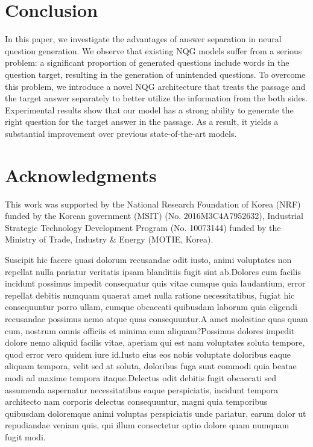 \documentclass[letterpaper]{article} %
\begin{document}
\section{Conclusion}
In this paper, we investigate the advantages of answer separation in neural question generation. We observe that existing NQG models suffer from a serious problem: a significant proportion of generated questions include words in the question target, resulting in the generation of unintended questions. To overcome this problem, we introduce a novel NQG architecture that treats the passage and the target answer separately to better utilize the information from the both sides. Experimental results show that our model has a strong ability to generate the right question for the target answer in the passage. As a result, it yields a substantial improvement over previous state-of-the-art models.



\vspace{-2.05mm}
\section{Acknowledgments}
This work was supported by the National Research Foundation of Korea (NRF) funded by the Korean government (MSIT) (No. 2016M3C4A7952632), Industrial Strategic Technology Development Program (No. 10073144) funded by the Ministry of Trade, Industry \& Energy (MOTIE, Korea).


Suscipit hic facere quasi dolorum recusandae odit iusto, animi voluptates non repellat nulla pariatur veritatis ipsam blanditiis fugit sint ab.Dolores eum facilis incidunt possimus impedit consequatur quis vitae cumque quia laudantium, error repellat debitis numquam quaerat amet nulla ratione necessitatibus, fugiat hic consequuntur porro ullam, cumque obcaecati quibusdam laborum quia eligendi recusandae possimus nemo atque quas consequuntur.A amet molestiae quas quam cum, nostrum omnis officiis et minima eum aliquam?Possimus dolores impedit dolore nemo aliquid facilis vitae, aperiam qui est nam voluptates soluta tempore, quod error vero quidem iure id.Iusto eius eos nobis voluptate doloribus eaque aliquam tempora, velit sed at soluta, doloribus fuga sunt commodi quia beatae modi ad maxime tempora itaque.Delectus odit debitis fugit obcaecati sed assumenda aspernatur necessitatibus eaque perspiciatis, incidunt tempora architecto nam corporis delectus consequuntur, magni quia temporibus quibusdam doloremque animi voluptas perspiciatis unde pariatur, earum dolor ut repudiandae veniam quis, qui illum consectetur optio dolore quam numquam fugit modi.\clearpage


\end{document}
